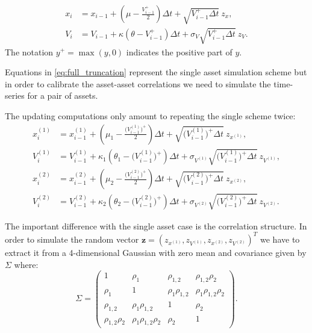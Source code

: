 \begin{subequations}
	\label{eq:full_truncation}
	\begin{align}
	x_i &= x_{i-1} + (\mu -  \frac{V_{i-1}^+}{2})\Delta t + \sqrt{V_{i-1}^+ \Delta t} \:z_x, \\
	V_i &= V_{i-1} + \kappa(\theta - V_{i-1}^+ )\Delta t + \sigma_V \sqrt{V_{i-1}^+ \Delta t} \: z_V.
	\end{align}
\end{subequations}
The notation $y^+ = \max(y, 0)$ indicates the positive part of $y$. 

Equations in \eqref{eq:full_truncation} represent the single asset simulation scheme but in order to calibrate the asset-asset correlations we need to simulate the time-series for a pair of assets.

The updating computations only amount to repeating the single scheme twice:
\begin{subequations}
	\label{eq:full_truncation2}
	\begin{align}
	x_i^{(1)} &= x_{i-1}^{(1)} + (\mu_1 -  \frac{\Big(V_{i-1}^{(1)}\Big)^+}{2})\Delta t + \sqrt{\Big(V_{i-1}^{(1)}\Big)^+ \Delta t} \:z_{x^{(1)}}, \\
	V_i^{(1)} &= V_{i-1}^{(1)} + \kappa_1(\theta_1 - \Big(V_{i-1}^{(1)}\Big)^+ )\Delta t + \sigma_{V^{(1)}} \sqrt{\Big(V_{i-1}^{(1)}\Big)^+ \Delta t} \: z_{V^(1)},\\
	x_i^{(2)} &= x_{i-1}^{(2)} + (\mu_2 -  \frac{\Big(V_{i-1}^{(2)}\Big)^+}{2})\Delta t + \sqrt{\Big(V_{i-1}^{(2)}\Big)^+\Delta t} \:z_{x^{(2)}}, \\
	V_i^{(2)} &= V_{i-1}^{(2)} + \kappa_2(\theta_2 - \Big(V_{i-1}^{(2)}\Big)^+ )\Delta t + \sigma_{V^{(2)}} \sqrt{\Big(V_{i-1}^{(2)}\Big)^+ \Delta t} \: z_{V^{(2)}}.
	\end{align}
\end{subequations}

The important difference with the single asset case is the correlation structure. In order to simulate the random vector $\mathbf{z} = (z_{x^{(1)}}, z_{V^{(1)}}, z_{x^{(2)}}, z_{V^{(2)}})^T$ we have to extract it from a 4-dimensional Gaussian with zero mean and covariance given by $\Sigma$ where:
\begin{equation}
\label{eq:corr_matrix}
	\Sigma = \begin{pmatrix}
	1 	& \rho_1 & \rho_{1,2} & \rho_{1,2} \rho_2\\
	\rho_1 & 1 & \rho_1 \rho_{1,2} & \rho_1 \rho_{1,2} \rho_2\\
	 \rho_{1,2} & \rho_1 \rho_{1,2}  & 1 & \rho_2 \\
	 \rho_{1,2} \rho_2 & \rho_1 \rho_{1,2} \rho_2&\rho_2  & 1
	\end{pmatrix}.
\end{equation}

